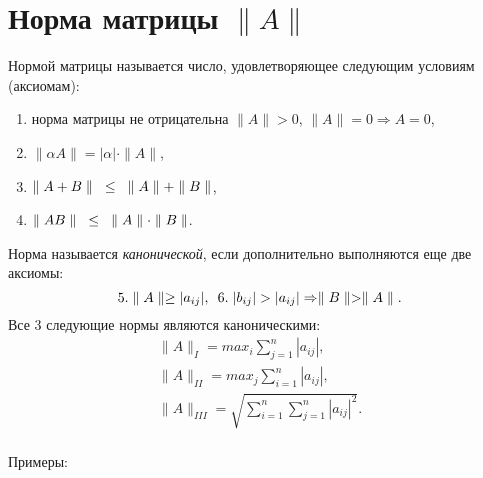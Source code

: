 \documentclass[a4paper,11pt]{article}
\begin{document}
\section{Норма матрицы $\parallel A\parallel$}
Нормой матрицы называется число, удовлетворяющее следующим условиям (аксиомам):
\begin{enumerate}
  \item норма матрицы не отрицательна $\parallel A\parallel >0$, $\parallel A\parallel =0 \Rightarrow A=0$,
  \item $\parallel \alpha A\parallel = |\alpha|\cdot\parallel A\parallel$,
  \item $\parallel A+B\parallel \hspace{3mm}\le\hspace{3mm} \parallel A\parallel + \parallel B\parallel$,
  \item $\parallel AB\parallel \hspace{3mm}\le\hspace{3mm} \parallel A\parallel \cdot \parallel B\parallel$.
\end{enumerate}
Норма называется \textit{канонической}, если дополнительно выполняются еще две аксиомы:
\begin{equation*}
  5. \parallel A\parallel \ge |a_{ij}|, \hspace{5pt} 6. \hspace{1mm}|b_{ij}|>|a_{ij}| \Rightarrow \parallel B\parallel > \parallel A \parallel.
\end{equation*}
Все 3 следующие нормы являются каноническими:
\begin{gather*}
  \parallel A\parallel_I = max_i \sum_{j=1}^n |a_{ij}|, \\
  \parallel A\parallel_{II} = max_j \sum_{i=1}^n |a_{ij}|, \\
  \parallel A \parallel_{III} = \sqrt{\sum_{i=1}^n \sum_{j=1}^n |a_{ij}|^2}.\\
\end{gather*}

Примеры:
\end{document}
